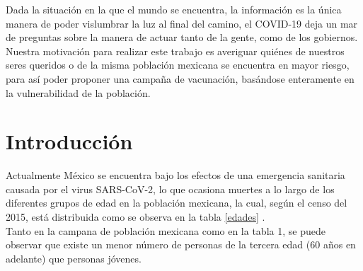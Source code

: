\documentclass[12pt,a4paper]{article}
\begin{document}
\setlength{\parindent}{0cm}
Dada la situación en la que el mundo se encuentra, la información es la única manera de poder vislumbrar la luz al final del camino, el COVID-19 deja un mar de preguntas sobre la manera de actuar tanto de la gente, como de los gobiernos. Nuestra motivación para realizar este trabajo es averiguar quiénes de nuestros seres queridos o de la misma población mexicana se encuentra en mayor riesgo, para así poder proponer una campaña de vacunación, basándose enteramente en la vulnerabilidad de la población.
\setlength{\parindent}{1cm}


\section{Introducción}
\setlength{\parindent}{0cm}


Actualmente México se encuentra bajo los efectos de una emergencia sanitaria causada por el virus SARS-CoV-2, lo que ocasiona muertes a lo largo de los diferentes grupos de edad en la población mexicana, la cual, según el censo del 2015, está distribuida como se observa en la tabla \ref{edades} \citep{INEGI}. \\ Tanto en la campana de población mexicana como en la tabla 1, se puede observar que existe un menor número de personas de la tercera edad (60 años en adelante) que personas jóvenes.
\end{document}
